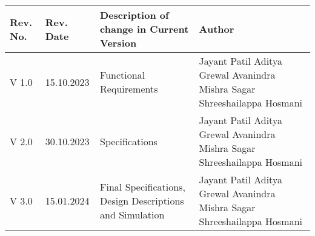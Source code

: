 
\begin{table}[H]
	\centering
 \begin{tabular}{|p{2cm}| p{2cm}|p{7.5cm}|p{5cm}|}
 \hline
      \hspace{2mm}\textbf{Rev. No.} & \textbf{Rev. Date} & \textbf{Description of change in Current Version} & \hspace{18mm}\textbf{Author}\\
      \hline
      \hline
      \hspace{6mm}V 1.0 & 15.10.2023 & \hspace{16mm}Functional Requirements & \hspace{15mm}Jayant Patil \newline \hspace{13mm}Aditya Grewal \newline \hspace{11mm}Avanindra Mishra \newline \hspace{2mm}Sagar Shreeshailappa Hosmani \\
      \hline
      \hspace{6mm}V 2.0 & 30.10.2023 & \hspace{22mm}Specifications & \hspace{15mm}Jayant Patil \newline \hspace{13mm}Aditya Grewal \newline \hspace{11mm}Avanindra Mishra \newline \hspace{2mm}Sagar Shreeshailappa Hosmani \\
      \hline
      \hspace{6mm}V 3.0 & 15.01.2024 & Final Specifications, Design Descriptions and Simulation & \hspace{15mm}Jayant Patil \newline \hspace{13mm}Aditya Grewal \newline \hspace{11mm}Avanindra Mishra \newline \hspace{2mm}Sagar Shreeshailappa Hosmani \\
       \hline
 \end{tabular}
\end{table}


